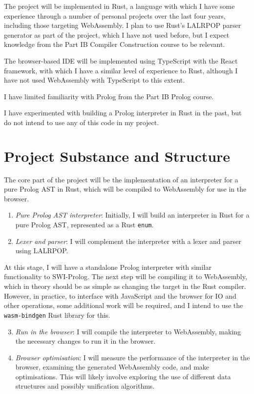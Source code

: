 \documentclass{article}
\begin{document}
The project will be implemented in Rust, a language with which I have some experience through a number of personal projects over the last four years, including those targeting WebAssembly. I plan to use Rust's LALRPOP \cite{lalrpop} parser generator as part of the project, which I have not used before, but I expect knowledge from the Part IB Compiler Construction course to be relevant.

The browser-based IDE will be implemented using TypeScript with the React framework, with which I have a similar level of experience to Rust, although I have not used WebAssembly with TypeScript to this extent.

I have limited familiarity with Prolog from the Part IB Prolog course.

I have experimented with building a Prolog interpreter in Rust in the past, but do not intend to use any of this code in my project.

\section*{Project Substance and Structure}

The core part of the project will be the implementation of an interpreter for a pure Prolog AST in Rust, which will be compiled to WebAssembly for use in the browser.

\begin{enumerate}

\item \emph{Pure Prolog AST interpreter}: Initially, I will build an interpreter in Rust for a pure Prolog AST, represented as a Rust \texttt{enum}.

\item \emph{Lexer and parser}: I will complement the interpreter with a lexer and parser using LALRPOP.

\end{enumerate}

At this stage, I will have a standalone Prolog interpreter with similar functionality to SWI-Prolog. The next step will be compiling it to WebAssembly, which in theory should be as simple as changing the target in the Rust compiler. However, in practice, to interface with JavaScript and the browser for IO and other operations, some additional work will be required, and I intend to use the \texttt{wasm-bindgen} \cite{wasmbindgen} Rust library for this.

\begin{enumerate}

\setcounter{enumi}{2}

\item \emph{Run in the browser}: I will compile the interpreter to WebAssembly, making the necessary changes to run it in the browser.

\item \emph{Browser optimisation}: I will measure the performance of the interpreter in the browser, examining the generated WebAssembly code, and make optimisations. This will likely involve exploring the use of different data structures and possibly unification algorithms.

\end{enumerate}
\end{document}
